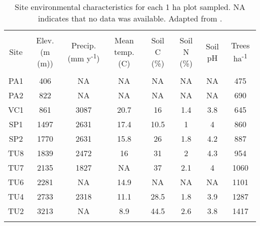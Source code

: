 
\begin{table}[!htbp] \centering 
  \caption{Site environmental characteristics for each 1 ha plot sampled. NA indicates that no data was available. Adapted from \citet{Whitaker2014}.} 
  \label{site_char} 
\begin{tabular}{@{\extracolsep{-2pt}} cccccccc} 
\\[-1.8ex]\hline 
\hline \\[-1.8ex] 
{Site} & {Elev. (m (m))} & {Precip. (mm y\textsuperscript{-1})} & { Mean temp. (\textdegree{}C)} & {Soil C (\%)} & {Soil N (\%)} & {Soil pH} & {Trees ha\textsuperscript{-1}} \\
\hline \\[-1.8ex] 
PA1 & 406 & NA & NA & NA & NA & NA & 475 \\ 
PA2 & 822 & NA & NA & NA & NA & NA & 690 \\ 
VC1 & 861 & 3087 & 20.7 & 16 & 1.4 & 3.8 & 645 \\ 
SP1 & 1497 & 2631 & 17.4 & 10.5 & 1 & 4 & 860 \\ 
SP2 & 1770 & 2631 & 15.8 & 26 & 1.8 & 4.2 & 887 \\ 
TU8 & 1839 & 2472 & 16 & 31 & 2 & 4.3 & 954 \\ 
TU7 & 2135 & 1827 & NA & 37 & 2.1 & 4 & 1060 \\ 
TU6 & 2281 & NA & 14.9 & NA & NA & NA & 1101 \\ 
TU4 & 2733 & 2318 & 11.1 & 28.5 & 1.8 & 3.9 & 1287 \\ 
TU2 & 3213 & NA & 8.9 & 44.5 & 2.6 & 3.8 & 1417 \\ 
\hline \\[-1.8ex] 
\end{tabular} 
\end{table} 
